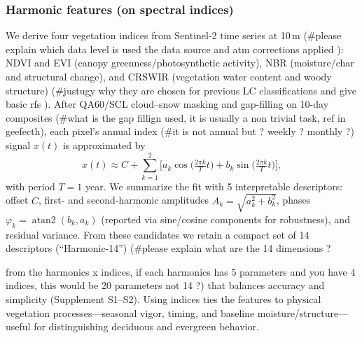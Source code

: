 \documentclass[utf8]{FrontiersinHarvard}
\begin{document}
\subsubsection{Harmonic features (on spectral indices)} %
We derive four vegetation indices from Sentinel-2 time series at 10\,m (#please explain which data level is used the data source and  atm corrections applied ): NDVI and EVI (canopy greenness/photosynthetic activity), NBR (moisture/char and structural change), and CRSWIR (vegetation water content and woody structure) (#justugy why they are chosen for previous LC classifications and give basic rfs ). After QA60/SCL cloud–snow masking and gap-filling on 10-day composites (#what is the gap fillign used, it is usually a non trivial task, ref in geefecth), each pixel's annual index (#it is not annual but ? weekly ? monthly ?) signal \(x(t)\) is approximated by
\begin{equation}
  x(t) \approx C + \sum_{k=1}^{2} \big[ a_k \cos\!\big( \tfrac{2\pi k}{T} t \big) + b_k \sin\!\big( \tfrac{2\pi k}{T} t \big) \big],
\end{equation}
with period \(T=1\) year. We summarize the fit with 5 interpretable descriptors: offset \(C\), first- and second-harmonic amplitudes \(A_k = \sqrt{a_k^2 + b_k^2}\), phases \(\varphi_k = \operatorname{atan2}(b_k, a_k)\) (reported via sine/cosine components for robustness), and residual variance. From these candidates we retain a compact set of 14 descriptors (“Harmonic-14”) (#please explain what are the 14 dimensions ?

from the harmonics x indices, if each harmonics has 5 parameters and you have 4 indices, this would be 20 parameters not 14 ?) that balances accuracy and simplicity (Supplement S1–S2). Using indices ties the features to physical vegetation processes—seasonal vigor, timing, and baseline moisture/structure—useful for distinguishing deciduous and evergreen behavior.
\end{document}
